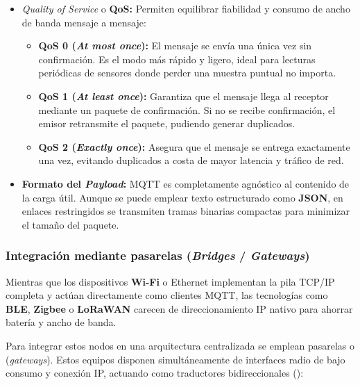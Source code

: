 \documentclass[../main.tex]{subfiles}
\begin{document}
                \begin{itemize}
                    \item \emph{Quality of Service} o \textbf{QoS:} Permiten equilibrar fiabilidad y consumo de ancho de banda mensaje a mensaje:
                    \begin{itemize}
                        \item \textbf{QoS 0 (\emph{At most once}):} El mensaje se envía una única vez sin confirmación. Es el modo más rápido y ligero, ideal para lecturas periódicas de sensores donde perder una muestra puntual no importa.
                        \item \textbf{QoS 1 (\emph{At least once}):} Garantiza que el mensaje llega al receptor mediante un paquete de confirmación. Si no se recibe confirmación, el emisor retransmite el paquete, pudiendo generar duplicados.
                        \item \textbf{QoS 2 (\emph{Exactly once}):} Asegura que el mensaje se entrega exactamente una vez, evitando duplicados a costa de mayor latencia y tráfico de red.
                    \end{itemize}

                    \item \textbf{Formato del \emph{Payload}:} MQTT es completamente agnóstico al contenido de la carga útil. Aunque se puede emplear texto estructurado como \textbf{JSON}, en enlaces restringidos se transmiten tramas binarias compactas para minimizar el tamaño del paquete.
                \end{itemize}

            \subsubsection{Integración mediante pasarelas (\emph{Bridges} / \emph{Gateways})}
                Mientras que los dispositivos \textbf{Wi-Fi} o Ethernet implementan la pila TCP/IP completa y actúan directamente como clientes MQTT, las tecnologías como \textbf{BLE}, \textbf{Zigbee} o \textbf{LoRaWAN} carecen de direccionamiento IP nativo para ahorrar batería y ancho de banda.

                Para integrar estos nodos en una arquitectura centralizada se emplean pasarelas o (\emph{gateways}). Estos equipos disponen simultáneamente de interfaces radio de bajo consumo y conexión IP, actuando como traductores bidireccionales ():
\end{document}
